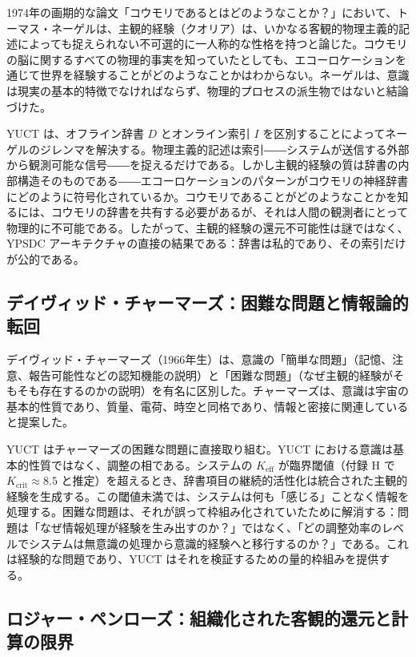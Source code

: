 \documentclass[12pt,a4paper]{article}
\begin{document}
	1974年の画期的な論文「コウモリであるとはどのようなことか？」において、トーマス・ネーゲルは、主観的経験（クオリア）は、いかなる客観的物理主義的記述によっても捉えられない不可選的に一人称的な性格を持つと論じた。コウモリの脳に関するすべての物理的事実を知っていたとしても、エコーロケーションを通じて世界を経験することがどのようなことかはわからない。ネーゲルは、意識は現実の基本的特徴でなければならず、物理的プロセスの派生物ではないと結論づけた。
	
	YUCT は、オフライン辞書 \(D\) とオンライン索引 \(I\) を区別することによってネーゲルのジレンマを解決する。物理主義的記述は索引――システムが送信する外部から観測可能な信号――を捉えるだけである。しかし主観的経験の質は辞書の内部構造そのものである――エコーロケーションのパターンがコウモリの神経辞書にどのように符号化されているか。コウモリであることがどのようなことかを知るには、コウモリの辞書を共有する必要があるが、それは人間の観測者にとって物理的に不可能である。したがって、主観的経験の還元不可能性は謎ではなく、YPSDC アーキテクチャの直接の結果である：辞書は私的であり、その索引だけが公的である。
	
	\subsection{デイヴィッド・チャーマーズ：困難な問題と情報論的転回}
	
	デイヴィッド・チャーマーズ（1966年生）は、意識の「簡単な問題」（記憶、注意、報告可能性などの認知機能の説明）と「困難な問題」（なぜ主観的経験がそもそも存在するのかの説明）を有名に区別した。チャーマーズは、意識は宇宙の基本的性質であり、質量、電荷、時空と同格であり、情報と密接に関連していると提案した。
	
	YUCT はチャーマーズの困難な問題に直接取り組む。YUCT における意識は基本的性質ではなく、調整の相である。システムの \(K_{\mathrm{eff}}\) が臨界閾値（付録 H で \(K_{\mathrm{crit}} \approx 8.5\) と推定）を超えるとき、辞書項目の継続的活性化は統合された主観的経験を生成する。この閾値未満では、システムは何も「感じる」ことなく情報を処理する。困難な問題は、それが誤って枠組み化されていたために解消する：問題は「なぜ情報処理が経験を生み出すのか？」ではなく、「どの調整効率のレベルでシステムは無意識の処理から意識的経験へと移行するのか？」である。これは経験的な問題であり、YUCT はそれを検証するための量的枠組みを提供する。
	
	\subsection{ロジャー・ペンローズ：組織化された客観的還元と計算の限界}
	
\end{document}
